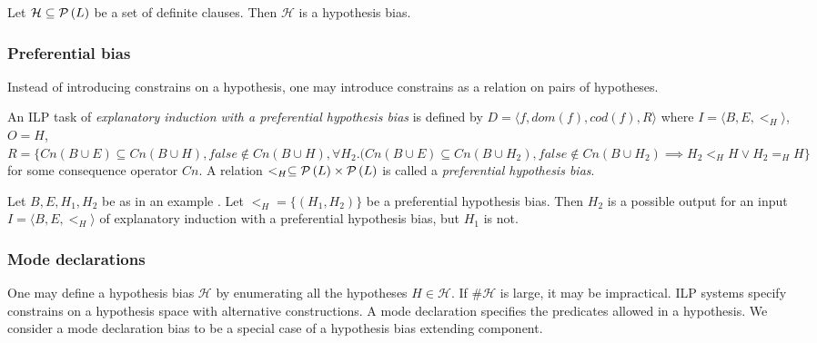 \begin{exmp}
Let $\mathcal{H} \subseteq \mathcal{P} \left({ L }\right)$ be a set of definite clauses. Then $\mathcal{H}$ is a hypothesis bias.
\end{exmp}

\subsubsection{Preferential bias}
Instead of introducing constrains on a hypothesis, one may introduce constrains as a relation on pairs of hypotheses.

\begin{defn}
An ILP task of \emph{explanatory induction with a preferential hypothesis bias} is defined by $D=\langle f, dom(f), cod(f), R \rangle$ where $I=\langle B, E, <_H\rangle$, $O=H$,
$R=\{Cn(B \cup E) \subseteq Cn(B \cup H), false \not\in Cn(B \cup H), \forall H_2. (Cn(B \cup E) \subseteq Cn(B \cup H_2), false \not\in Cn(B \cup H_2) \implies H_2 <_H H \lor H_2 =_H H \}$ for some consequence operator $Cn$. A relation $<_H \subseteq \mathcal{P} \left({ L }\right) \times \mathcal{P} \left({ L }\right)$ is called a \emph{preferential hypothesis bias}.
\end{defn}

\begin{exmp}
Let $B, E, H_1, H_2$ be as in an example .
Let $<_H=\{(H_1, H_2)\}$ be a preferential hypothesis bias.
Then $H_2$ is a possible output for an input $I=\langle B, E, <_H \rangle$ of explanatory induction with a preferential hypothesis bias, but $H_1$ is not.
\end{exmp}

\subsubsection{Mode declarations}
One may define a hypothesis bias $\mathcal{H}$ by enumerating all the hypotheses $H \in \mathcal{H}$. If $\#\mathcal{H}$ is large, it may be impractical. ILP systems specify constrains on a hypothesis space with alternative constructions. A mode declaration\cite{muggleton1995inverse} specifies the predicates allowed in a hypothesis. We consider a mode declaration bias to be a special case of a hypothesis bias extending component.

